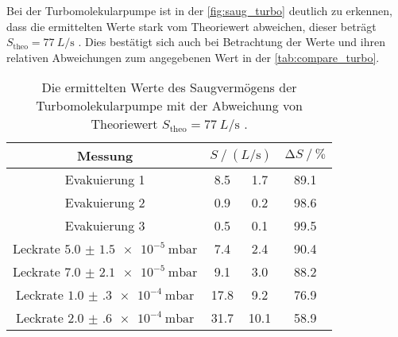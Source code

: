 \noindent Bei der Turbomolekularpumpe ist in der \autoref{fig:saug_turbo} deutlich zu erkennen, dass die ermittelten Werte stark vom Theoriewert abweichen, dieser beträgt $S_\text{theo} =
\SI{77}{L\per\second}$ \cite{anleitung}. Dies bestätigt sich auch bei Betrachtung der Werte und ihren relativen Abweichungen zum angegebenen Wert in der \autoref{tab:compare_turbo}. 

\begin{table}
    \centering
    \caption{Die ermittelten Werte des Saugvermögens der Turbomolekularpumpe mit der Abweichung von Theoriewert $S_\text{theo} = \SI{77}{L\per\second}$ \cite{anleitung}.}
    \label{tab:compare_turbo}
    \begin{tabular}{c  S @{${}\pm{}$} S  S}
        \toprule
        {Messung} &  & {$\increment S  \mathbin{/} \si{\percent}$} \\ 
        \midrule
        Evakuierung 1                           & 8.5 & 1.7 & 89.1\\
        Evakuierung 2                           & 0.9 & 0.2 & 98.6\\
        Evakuierung 3                           & 0.5 & 0.1 & 99.5\\
        Leckrate $\SI{5.0(15)e-5}{\milli\bar}$  & 7.4 & 2.4 & 90.4\\
        Leckrate $\SI{7.0(21)e-5}{\milli\bar}$  & 9.1 & 3.0 & 88.2\\
        Leckrate $\SI{1.0(3)e-4}{\milli\bar}$   &17.8 & 9.2 & 76.9\\
        Leckrate $\SI{2.0(6)e-4}{\milli\bar}$   &31.7 &10.1 & 58.9\\
        \bottomrule
    \end{tabular}
\end{table}

